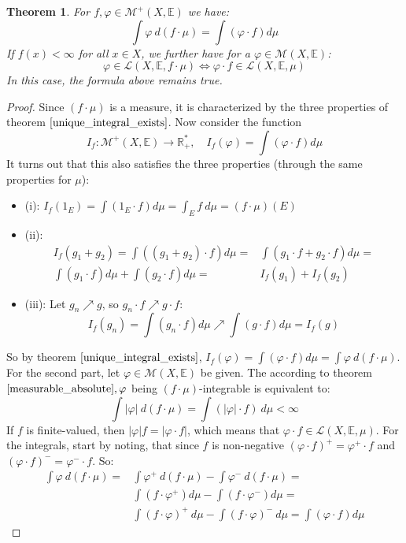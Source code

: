 \documentclass[12pt, a4paper]{article}
\newtheorem{theorem}{Theorem}[section]
\numberwithin{equation}{section}
\begin{document}
\begin{theorem}
For $f, \varphi\in\mathcal{M}^+(X,\mathbb{E})$ we have:
\begin{equation}
\int\varphi\ d(f\cdot\mu)=\int(\varphi\cdot f)d\mu
\end{equation}
If $f(x)<\infty$ for all $x\in X$, we further have for a $\varphi\in\mathcal{M}(X,\mathbb{E})$:
\begin{equation}
\varphi\in\mathcal{L}(X,\mathbb{E},f\cdot\mu)\Leftrightarrow\varphi\cdot f\in\mathcal{L}(X,\mathbb{E},\mu)
\end{equation}
In this case, the formula above remains true.
\end{theorem}
\begin{proof}
Since $(f\cdot\mu)$ is a measure, it is characterized by the three properties of theorem $\ref{unique_integral_exists}$. Now consider the function
\begin{equation}
I_f: \mathcal{M}^+(X,\mathbb{E})\rightarrow\mathbb{R}^*_+,\quad I_f(\varphi)=\int(\varphi\cdot f)d\mu
\end{equation}
It turns out that this also satisfies the three properties (through the same properties for $\mu$):
\begin{itemize}
\item (i): $I_f(1_E)=\int(1_E\cdot f)d\mu=\int_E f\ d\mu=(f\cdot\mu)(E)$
\item (ii):
\begin{align*}
I_f (g_1+g_2)=\int((g_1+g_2)\cdot f)d\mu=&\int(g_1\cdot f+g_2\cdot f)d\mu=\\
\int(g_1\cdot f)d\mu+\int(g_2\cdot f)d\mu=&I_f (g_1)+I_f(g_2)
\end{align*}
\item (iii): Let $g_n\nearrow g$, so $g_n\cdot f\nearrow g\cdot f$:
\begin{equation}
I_f(g_n)=\int(g_n\cdot f)d\mu\nearrow\int(g\cdot f)d\mu=I_f(g)
\end{equation}
\end{itemize}
So by theorem $\ref{unique_integral_exists}$, $I_f(\varphi)=\int(\varphi\cdot f)d\mu=\int\varphi\ d(f\cdot\mu)$.\\
For the second part, let $\varphi\in\mathcal{M}(X,\mathbb{E})$ be given. The according to theorem $\ref{measurable_absolute}, \varphi$ being $(f\cdot\mu)$-integrable is equivalent to:
\begin{equation}
\int|\varphi|\ d(f\cdot\mu)=\int(|\varphi|\cdot f)\ d\mu<\infty
\end{equation}
If $f$ is finite-valued, then $|\varphi|f=|\varphi\cdot f|$, which means that $\varphi\cdot f\in\mathcal{L}(X,\mathbb{E},\mu)$. For the integrals, start by noting, that since $f$ is non-negative $(\varphi\cdot f)^+=\varphi^+\cdot f$ and $(\varphi\cdot f)^-=\varphi^-\cdot f$. So:
\begin{align}
\int\varphi\ d(f\cdot\mu)=&\int\varphi^+\ d(f\cdot\mu)-\int\varphi^-\ d(f\cdot\mu)=\\
&\int(f\cdot\varphi^+)d\mu-\int(f\cdot\varphi^-)d\mu=\\
&\int(f\cdot\varphi)^+\ d\mu-\int(f\cdot\varphi)^-\ d\mu=\int(\varphi\cdot f)d\mu
\end{align}
\end{proof}
\end{document}
